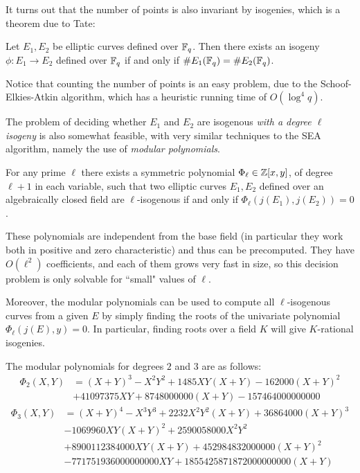 It turns out that the number of points is also invariant by isogenies, which is a theorem due to Tate:
\begin{theorem}
    Let $E_1,E_2$ be elliptic curves defined over $\mathbb{F}_q$. Then there exists an isogeny $\phi: E_1\to E_2$ defined over $\mathbb{F}_q$ if and only if $\# E_1(\mathbb{F}_q)=\# E_2(\mathbb{F}_q)$.
\end{theorem}

Notice that counting the number of points is an easy problem, due to the Schoof-Elkies-Atkin algorithm, which has a heuristic running time of $O(\log^4 q)$.

The problem of deciding whether $E_1$ and $E_2$ are isogenous \emph{with a degree $\ell$ isogeny} is also somewhat feasible, with very similar techniques to the SEA algorithm, namely the use of \emph{modular polynomials}.

\begin{theorem}
    For any prime $\ell$ there exists a symmetric polynomial $\Phi_\ell\in\mathbb{Z}[x,y]$, of degree $\ell+1$ in each variable, such that two elliptic curves $E_1,E_2$ defined over an algebraically closed field are $\ell$-isogenous if and only if $\Phi_\ell(j(E_1),j(E_2))=0$.
\end{theorem}

These polynomials are independent from the base field (in particular they work both in positive and zero characteristic) and thus can be precomputed. They have $O(\ell^2)$ coefficients, and each of them grows very fast in size, so this decision problem is only solvable for ``small" values of $\ell$.

Moreover, the modular polynomials can be used to compute all $\ell$-isogenous curves from a given $E$ by simply finding the roots of the univariate polynomial $\Phi_\ell(j(E),y)=0$. In particular, finding roots over a field $K$ will give $K$-rational isogenies.

\begin{example}
    The modular polynomials for degrees $2$ and $3$ are as follows:
    \begin{align*}
    \Phi_2(X,Y) &= (X+Y)^3-X^2Y^2+1485XY(X+Y)-162000(X+Y)^2 \\
    & + 41097375 XY + 8748000000(X+Y) - 157464000000000
    \end{align*}
    \begin{align*}
    \Phi_3(X,Y) &= (X+Y)^4 - X^3Y^3 + 2232X^2Y^2(X+Y) + 36864000(X+Y)^3\\
    & - 1069960XY(X+Y)^2 + 2590058000X^2Y^2\\
    & + 8900112384000XY(X+Y) + 452984832000000(X+Y)^2\\
    & - 771751936000000000XY + 1855425871872000000000(X+Y)
    \end{align*}
\end{example}

